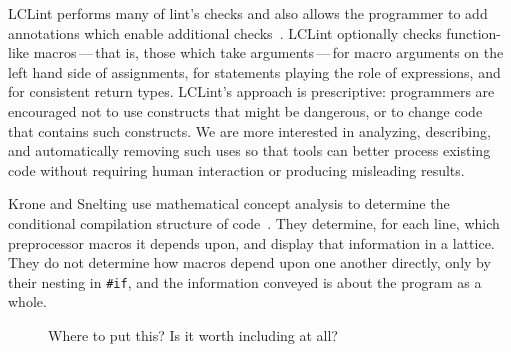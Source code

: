 \documentclass[10pt]{article}
\begin{document}
LCLint performs many of lint's checks and also
allows the programmer to add annotations which enable additional
checks~\cite{Evans-pldi96,Evans-fse94}.
LCLint optionally checks function-like
macros\,---\,that is, those which take arguments\,---\,for
macro arguments on the left hand side of assignments, for statements
playing the role of expressions, and for consistent return types.
LCLint's approach is prescriptive: programmers are encouraged not to use
constructs that might be dangerous, or to change code that contains such
constructs.  We are more interested in analyzing, describing, and
automatically removing such uses so that tools can better process existing
code without requiring human interaction or producing misleading results.


Krone and Snelting use mathematical concept analysis to determine the
conditional compilation structure of code~\cite{Krone94}.  They determine,
for each line, which preprocessor macros it depends upon, and display that
information in a lattice.  They do not determine how macros depend upon one
another directly, only by their nesting in {\tt \#if}, and the information
conveyed is about the program as a whole.


\begin{figure}
\centerline{}
\caption{Where to put this?  Is it worth including at all?}
\label{fig:cat-numargs}
\end{figure}


{\small }
\end{document}
